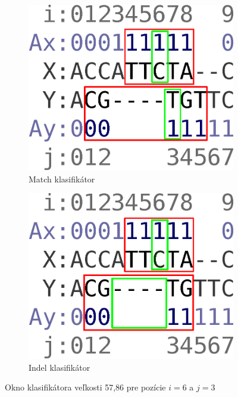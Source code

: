 \begin{figure}[h]
        \centering
        \begin{subfigure}[b]{0.35\textwidth}
                \includegraphics[width=\textwidth]{images/window_m}
                \caption{Match klasifikátor}
                \label{fig:window-m}
        \end{subfigure}%
        \qquad\qquad %
        \begin{subfigure}[b]{0.35\textwidth}
                \includegraphics[width=\textwidth]{images/window_i}
                \caption{Indel klasifikátor}
                \label{fig:window-i}
        \end{subfigure}
        \caption[Okno klasifikátora]{Okno klasifikátora veľkosti 57,86 pre pozície $i = 6$ a $j = 3$}
\end{figure}

